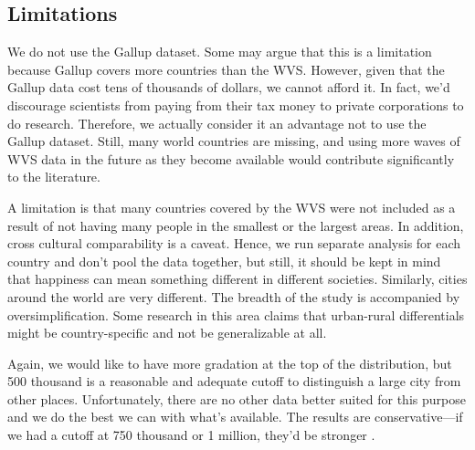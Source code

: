 \documentclass[11pt, letterpaper]{article}
\begin{document}
\begin{spacing}{1.4} %



\subsection*{Limitations}

We do not use the Gallup dataset. Some may argue that this is a limitation because Gallup covers more countries than the WVS. However, given that the Gallup data cost tens of thousands of dollars, we cannot afford it. In fact, we'd discourage scientists from paying from their tax money to private corporations to do research. Therefore, we actually consider it an advantage not to use the Gallup dataset. Still, many world countries are missing, and using more waves of WVS data in the future as they
become available would contribute significantly to the literature. 

A limitation is that many countries covered by the WVS were not included as a result of not having
many people in the smallest or the largest areas. In addition, cross cultural
comparability is a caveat. Hence, we run separate analysis for each country and
don't pool the data together, but still, it should be kept in mind that
happiness can mean something different in different societies. Similarly, cities
around the world are very different. The breadth of the study is accompanied by
oversimplification. Some research in this area claims that urban-rural differentials might be country-specific and not be generalizable at all. %

Again, we would like to have more gradation at the top of the distribution, but
500 thousand is a reasonable and adequate cutoff to distinguish a large city
from other places. Unfortunately, there are no other data better suited for this
purpose and we do the best we can with what's available. The results are
conservative---if we had a cutoff at 750 thousand or 1 million, they'd be
stronger \citep{aokCityBook15}.


\end{spacing}
\end{document}

